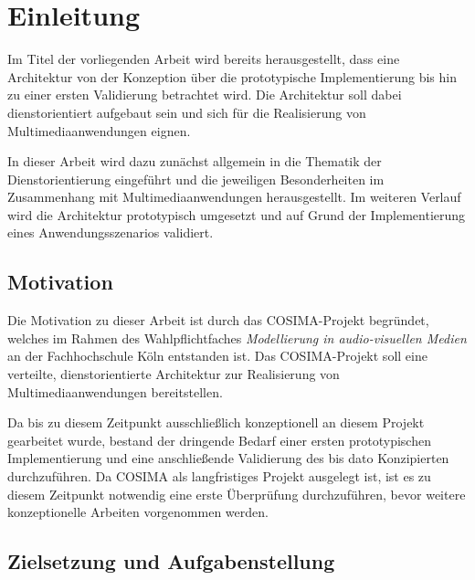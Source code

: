 
\chapter{Einleitung} %
\label{cha:einleitung}

  Im Titel der vorliegenden Arbeit wird bereits herausgestellt, dass eine Architektur von der Konzeption über die prototypische Implementierung bis hin zu einer ersten Validierung betrachtet wird. Die Architektur soll dabei dienstorientiert aufgebaut sein und sich für die Realisierung von Multimediaanwendungen eignen.
  
  In dieser Arbeit wird dazu zunächst allgemein in die Thematik der Dienstorientierung eingeführt und die jeweiligen Besonderheiten im Zusammenhang mit Multimediaanwendungen herausgestellt. Im weiteren Verlauf wird die Architektur prototypisch umgesetzt und auf Grund der Implementierung eines Anwendungsszenarios validiert.

\section{Motivation} %
\label{sec:motivation}

  Die Motivation zu dieser Arbeit ist durch das COSIMA-Projekt begründet, welches im Rahmen des Wahlpflichtfaches \emph{Modellierung in audio-visuellen Medien} an der Fachhochschule Köln entstanden ist. Das COSIMA-Projekt soll eine verteilte, dienstorientierte Architektur zur Realisierung von Multimediaanwendungen bereitstellen.
  
  Da bis zu diesem Zeitpunkt ausschließlich konzeptionell an diesem Projekt gearbeitet wurde, bestand der dringende Bedarf einer ersten prototypischen Implementierung und eine anschließende Validierung des bis dato Konzipierten durchzuführen. Da COSIMA als langfristiges Projekt ausgelegt ist, ist es zu diesem Zeitpunkt notwendig eine erste Überprüfung durchzuführen, bevor weitere konzeptionelle Arbeiten vorgenommen werden.


\section{Zielsetzung und Aufgabenstellung} %
\label{sec:zielsetzung_und_aufgabenstellung}

